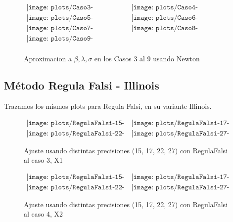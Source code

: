 \begin{figure}
$\begin{array}{cc}
\texttt{[image: plots/Caso3-Newton.png]} &
\texttt{[image: plots/Caso4-Newton.png]} \\
\texttt{[image: plots/Caso5-Newton.png]} &
\texttt{[image: plots/Caso6-Newton.png]} \\
\texttt{[image: plots/Caso7-Newton.png]} &
\texttt{[image: plots/Caso8-Newton.png]} \\
\texttt{[image: plots/Caso9-Newton.png]} &\\
\end{array}$

\caption{Aproximacion a $\beta, \lambda, \sigma$ en los Casos 3 al 9 usando Newton}
\label{fig:AproxCasosNewton}
\end{figure}

\subsection{M\'etodo Regula Falsi - Illinois}


Trazamos los mismos plots para Regula Falsi, en su variante Illinois.

\begin{figure} [H]
$\begin{array}{cc}
\texttt{[image: plots/RegulaFalsi-15-caso3.png]} &
\texttt{[image: plots/RegulaFalsi-17-caso3.png]} \\
\texttt{[image: plots/RegulaFalsi-22-caso3.png]} &
\texttt{[image: plots/RegulaFalsi-27-caso3.png]}
\end{array}$
\caption{Ajuste usando distintas precisiones (15, 17, 22, 27) con RegulaFalsi al caso 3, X1}
\label{fig:FitCaso3RegulaFalsi}
\end{figure}

\begin{figure} [H]
$\begin{array}{cc}
\texttt{[image: plots/RegulaFalsi-15-caso4.png]} &
\texttt{[image: plots/RegulaFalsi-17-caso4.png]} \\
\texttt{[image: plots/RegulaFalsi-22-caso4.png]} &
\texttt{[image: plots/RegulaFalsi-27-caso4.png]}
\end{array}$
\caption{Ajuste usando distintas precisiones (15, 17, 22, 27) con RegulaFalsi al caso 4, X2}
\label{fig:FitCaso4Newton}
\end{figure}


